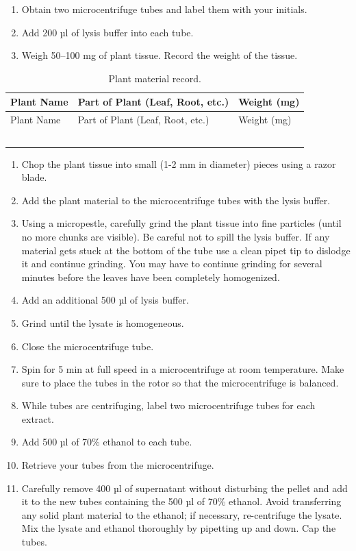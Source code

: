 \documentclass[]{book}
\providecommand{\tightlist}{%
  \setlength{\itemsep}{0pt}\setlength{\parskip}{0pt}}
\begin{document}
\begin{enumerate}
\def\labelenumi{\arabic{enumi}.}
\tightlist
\item
  Obtain two microcentrifuge tubes and label them with your initials.
\item
  Add 200 µl of lysis buffer into each tube.
\item
  Weigh 50--100 mg of plant tissue. Record the weight of the tissue.
\end{enumerate}

\begin{longtable}[]{@{}lll@{}}
\caption{\label{tab:plant} Plant material record.}\tabularnewline
\toprule
Plant Name & Part of Plant (Leaf, Root, etc.) & Weight
(mg)\tabularnewline
\midrule
\endfirsthead
\toprule
Plant Name & Part of Plant (Leaf, Root, etc.) & Weight
(mg)\tabularnewline
\midrule
\endhead
& &\tabularnewline
& &\tabularnewline
& &\tabularnewline
& &\tabularnewline
& &\tabularnewline
\bottomrule
\end{longtable}

\begin{enumerate}
\def\labelenumi{\arabic{enumi}.}
\setcounter{enumi}{3}
\tightlist
\item
  Chop the plant tissue into small (1-2 mm in diameter) pieces using a
  razor blade.
\item
  Add the plant material to the microcentrifuge tubes with the lysis
  buffer.
\item
  Using a micropestle, carefully grind the plant tissue into fine
  particles (until no more chunks are visible). Be careful not to spill
  the lysis buffer. If any material gets stuck at the bottom of the tube
  use a clean pipet tip to dislodge it and continue grinding. You may
  have to continue grinding for several minutes before the leaves have
  been completely homogenized.
\item
  Add an additional 500 µl of lysis buffer.
\item
  Grind until the lysate is homogeneous.
\item
  Close the microcentrifuge tube.
\item
  Spin for 5 min at full speed in a microcentrifuge at room temperature.
  Make sure to place the tubes in the rotor so that the microcentrifuge
  is balanced.\\
\item
  While tubes are centrifuging, label two microcentrifuge tubes for each
  extract.
\item
  Add 500 µl of 70\% ethanol to each tube.
\item
  Retrieve your tubes from the microcentrifuge.
\item
  Carefully remove 400 µl of supernatant without disturbing the pellet
  and add it to the new tubes containing the 500 µl of 70\% ethanol.
  Avoid transferring any solid plant material to the ethanol; if
  necessary, re-centrifuge the lysate. Mix the lysate and ethanol
  thoroughly by pipetting up and down. Cap the tubes.
\end{enumerate}
\end{document}
